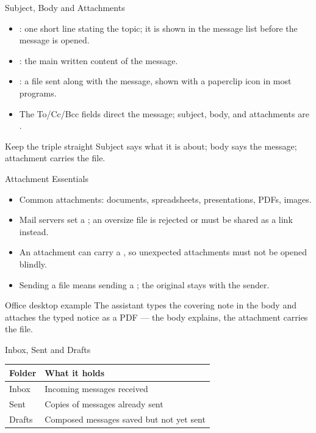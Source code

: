 \documentclass[aspectratio=169]{beamer}
\begin{document}
\begin{frame}{Subject, Body and Attachments}
  \begin{itemize}
    \item {}: one short line stating the topic; it is shown in the
      message list before the message is opened.
    \item {}: the main written content of the message.
    \item {}: a file sent along with the message, shown with a
      paperclip icon in most programs.
    \item The To/Cc/Bcc fields direct the message; subject, body, and
      attachments are .
  \end{itemize}
  \begin{block}{Keep the triple straight}
    Subject says what it is about; body says the message; attachment carries the file.
  \end{block}
\end{frame}

\begin{frame}{Attachment Essentials}
  \begin{itemize}
    \item Common attachments: documents, spreadsheets, presentations, PDFs,
      images.
    \item Mail servers set a ; an oversize file is rejected or
      must be shared as a link instead.
    \item An attachment can carry a , so unexpected attachments must
      not be opened blindly.
    \item Sending a file means sending a ; the original stays with
      the sender.
  \end{itemize}
  \begin{exampleblock}{Office desktop example}
    The assistant types the covering note in the body and attaches the typed
    notice as a PDF --- the body explains, the attachment carries the file.
  \end{exampleblock}
\end{frame}

\begin{frame}{Inbox, Sent and Drafts}
  \begin{center}
    \begin{tabular}{p{}p{}}
      \toprule
      \textbf{Folder} & \textbf{What it holds} \\
      \midrule
      Inbox & Incoming messages received \\
      Sent & Copies of messages already sent \\
      Drafts & Composed messages saved but not yet sent \\
      \bottomrule
    \end{tabular}
  \end{center}
  \vspace{0.25cm}
\end{frame}
\end{document}
